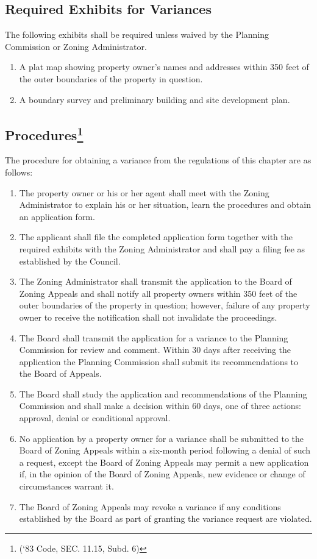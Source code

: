 \subsection{Required Exhibits for Variances}
The following exhibits shall be required unless waived by the Planning Commission or Zoning Administrator.
\begin{enumerate}[{\indent}1)]
    \item A plat map showing property owner’s names and addresses within 350 feet of the outer boundaries of the property in question.
    \item A boundary survey and preliminary building and site development plan.
\end{enumerate}
\subsection{Procedures\footnote{(‘83 Code, SEC. 11.15, Subd. 6)}}
The procedure for obtaining a variance from the regulations of this chapter are as follows:
\begin{enumerate}[{\indent}1)]
    \item The property owner or his or her agent shall meet with the Zoning Administrator to explain his or her situation, learn the procedures and obtain an application form.
    \item The applicant shall file the completed application form together with the required exhibits with the Zoning Administrator and shall pay a filing fee as established by the Council.
    \item The Zoning Administrator shall transmit the application to the Board of Zoning Appeals and shall notify all property owners within 350 feet of the outer boundaries of the property in question; however, failure of any property owner to receive the notification shall not invalidate the proceedings.
    \item The Board shall transmit the application for a variance to the Planning Commission for review and comment. Within 30 days after receiving the application the Planning Commission shall submit its recommendations to the Board of Appeals.
    \item The Board shall study the application and recommendations of the Planning Commission and shall make a decision within 60 days, one of three actions: approval, denial or conditional approval.
    \item No application by a property owner for a variance shall be submitted to the Board of Zoning Appeals within a six-month period following a denial of such a request, except the Board of Zoning Appeals may permit a new application if, in the opinion of the Board of Zoning Appeals, new evidence or change of circumstances warrant it.
    \item The Board of Zoning Appeals may revoke a variance if any conditions established by the Board as part of granting the variance request are violated.
\end{enumerate}
